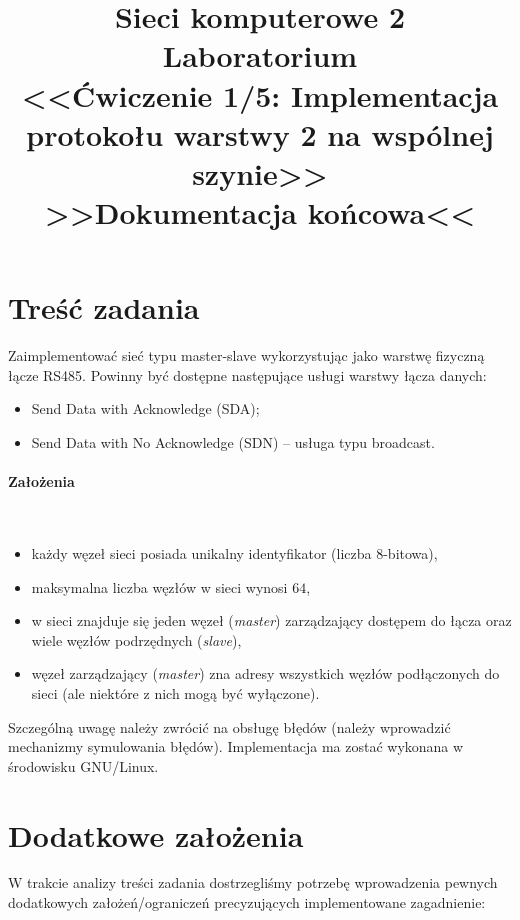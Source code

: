 \documentclass[a4paper,12pt]{article}
\title{
    \textbf{Sieci komputerowe 2 \\ Laboratorium} \\
    {\normalsize<<Ćwiczenie 1/5: Implementacja protokołu warstwy 2 na wspólnej szynie>>} \\
    {\large{>>Dokumentacja końcowa<<}}
}
\author{
    \makebox[8em][c]{Piotr Bałut} \and
    \makebox[8em][c]{Maciej Rubikowski} \and
    \makebox[8em][c]{Tomasz Pieczerak}
}
\begin{document}
\maketitle

\section{Treść zadania}
Zaimplementować sieć typu master-slave wykorzystując jako warstwę fizyczną
łącze RS485. Powinny być dostępne następujące usługi warstwy łącza danych:

\begin{itemize}
  \item Send Data with Acknowledge (SDA);
  \item Send Data with No Acknowledge (SDN) -- usługa typu broadcast.
\end{itemize}

\paragraph{Założenia}\

\begin{itemize}
  \item każdy węzeł sieci posiada unikalny identyfikator (liczba 8-bitowa),
  \item maksymalna liczba węzłów w sieci wynosi $64$,
  \item w sieci znajduje się jeden węzeł (\emph{master}) zarządzający
        dostępem do łącza oraz wiele węzłów podrzędnych (\emph{slave}),
  \item węzeł zarządzający (\emph{master}) zna adresy wszystkich węzłów
        podłączonych do sieci (ale niektóre z nich mogą być wyłączone).
\end{itemize}

Szczególną uwagę należy zwrócić na obsługę błędów (należy wprowadzić
mechanizmy symulowania błędów). Implementacja ma zostać wykonana w środowisku
GNU/Linux.

\section{Dodatkowe założenia}

W trakcie analizy treści zadania dostrzegliśmy potrzebę wprowadzenia pewnych
dodatkowych założeń/ograniczeń precyzujących implementowane zagadnienie:
\end{document}
